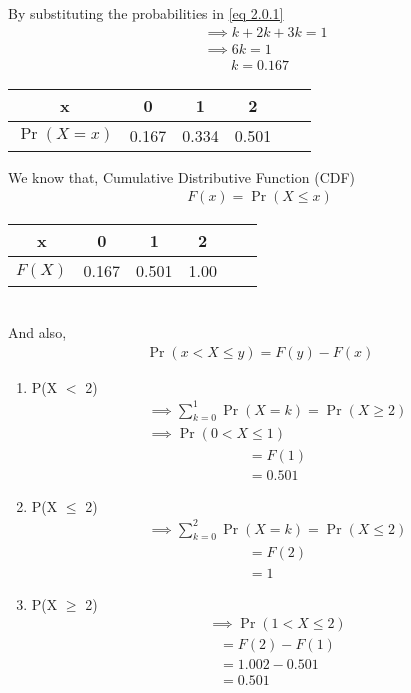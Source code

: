 \documentclass[10pt, a4paper]{article}
\providecommand{\brak}[1]{\ensuremath{\left(#1\right)}}
\begin{document}
By substituting the probabilities in \eqref{eq 2.0.1}
\begin{align}
& \implies k + 2k + 3k  = 1 \\
& \implies 6k = 1 
\end{align}
\begin{align}
    k = 0.167
\end{align}
\begin{center}
\begin{tabular}{|c|c|c|c|c|c|}
    \hline
    x &  0 & 1 & 2\\
    \hline
    $\Pr\brak{X=x}$ & 0.167 & 0.334 & 0.501\\
    \hline
\end{tabular} 
\end{center}
We know that, Cumulative Distributive Function (CDF) 
\begin{align}
    F(x) = \Pr\brak{X \le x}
\end{align}
\begin{table}[ht]
  
  \centering
  \begin{tabular}{|c|c|c|c|c|c|}
    \hline
    x &  0 & 1 & 2\\
    \hline
    $F(X)$ & 0.167 & 0.501 & 1.00 \\
    \hline
\end{tabular} 
\end{table}
\\And also, 
\begin{align}
     \Pr\brak{x < X \le y} = F\brak{y} - F\brak{x} 
\end{align}
 \begin{enumerate}
        \item P(X $<$ 2)
           \begin{align}
            & \implies \sum_{k = 0}^1 \Pr\brak{X = k} = \Pr\brak{X \ge 2}\\
            & \implies \Pr\brak{0 < X \le 1} 
        \end{align}
        \begin{align}
            & = F(1)\\
            & = 0.501
        \end{align}
        \item P(X $\leq$ 2)
        \begin{align}
         & \implies \sum_{k = 0}^2  \Pr\brak{X = k} = \Pr \brak{X \le 2}
         \end{align}
        \begin{align}
            & = F(2)\\
            & = 1   
        \end{align}
        
        \item P(X $\geq$ 2)
        \begin{align}
            & \implies \Pr\brak{1 < X \le 2} 
        \end{align}
        \begin{align}
            & = F(2) - F(1)\\
            & = 1.002 - 0.501\\
            & = 0.501
        \end{align}
    \end{enumerate}
  
\end{document}

